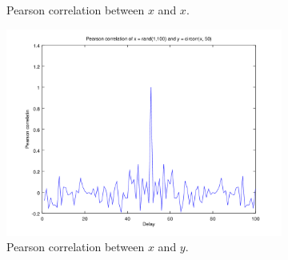 \documentclass{article}
\begin{document}
\begin{figure}[H]
\begin{subfigure}{0.49\textwidth}
		\caption{Pearson correlation between $x$ and $x$.}
	\end{subfigure}
	\begin{subfigure}{0.49\textwidth}
		\centering
		\includegraphics[width=\textwidth]{plot1gc.png}
		\caption{Pearson correlation between $x$ and $y$.}
	\end{subfigure}
	\caption{}
	\label{fig:1g1}
\end{figure}
\end{document}

